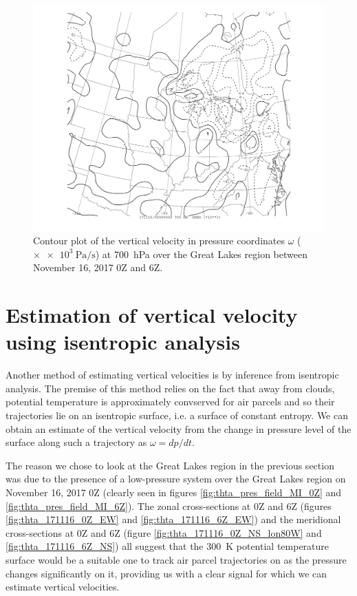 \documentclass[11pt]{article}
\begin{document}
\begin{figure}[h!]
  \centering
  \includegraphics[width=\textwidth,trim={2.5cm 1cm 2.5cm 0},clip]{omeg_MI_700hPa}
  \caption{Contour plot of the vertical velocity in pressure coordinates $\omega$ ($\times \SI{e3}{\Pa\per\s}$) at \SI{700}{\hecto\Pa} over the Great Lakes region between November 16, 2017 0Z and 6Z.}
  \label{fig:omega_MI_700hPa}
\end{figure}

\section{Estimation of vertical velocity using isentropic analysis}
Another method of estimating vertical velocities is by inference from isentropic analysis. The premise of this method relies on the fact that away from clouds, potential temperature is approximately convserved for air parcels and so their trajectories lie on an isentropic surface, i.e. a surface of constant entropy. We can obtain an estimate of the vertical velocity from the change in pressure level of the surface along such a trajectory as $\omega = dp/dt$.

The reason we chose to look at the Great Lakes region in the previous section was due to the presence of a low-pressure system over the Great Lakes region on November 16, 2017 0Z (clearly seen in figures \ref{fig:thta_pres_field_MI_0Z} and \ref{fig:thta_pres_field_MI_6Z}). The zonal cross-sections at 0Z and 6Z (figures \ref{fig:thta_171116_0Z_EW} and \ref{fig:thta_171116_6Z_EW}) and the meridional cross-sections at 0Z and 6Z (figure \ref{fig:thta_171116_0Z_NS_lon80W} and \ref{fig:thta_171116_6Z_NS}) all suggest that the \SI{300}{\K} potential temperature surface would be a suitable one to track air parcel trajectories on as the pressure changes significantly on it, providing us with a clear signal for which we can estimate vertical velocities.
\end{document}
